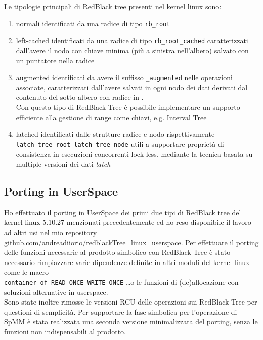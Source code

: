 \voidLine
Le tipologie principali di RedBlack tree presenti nel kernel linux sono:	\label{linuxRBTree_}
\begin{enumerate}
	\item normali  		identificati da una radice di tipo \verb|rb_root|
	\item left-cached 	identificati da una radice di tipo \verb|rb_root_cached|
		caratterizzati dall'avere il nodo con chiave minima (più a sinistra nell'albero) salvato con un puntatore nella radice
	\item augmented		identificati da avere il suffisso \verb|_augmented| nelle operazioni associate,
		caratterizzati dall'avere salvati in ogni nodo  dei dati derivati dal contenuto del sotto albero con radice in .\\
		Con questo tipo di RedBlack Tree è possibile implementare un supporto efficiente alla gestione di range come chiavi,
		e.g. Interval Tree \cite{rbtreeRst}
	\item latched		identificati dalle strutture radice e nodo rispettivamente \\ \verb|latch_tree_root latch_tree_node|
		utili a supportare proprietà di consistenza in esecuzioni concorrenti lock-less,
		mediante la tecnica basata su multiple versioni dei dati \emph{latch}
\end{enumerate}

\subsection{Porting in UserSpace} 
Ho effettuato il porting in UserSpace dei primi due tipi di RedBlack tree del kernel linux 5.10.27 menzionati precedentemente 
ed ho reso disponibile il lavoro ad altri usi nel mio repository \url{github.com/andreadiiorio/redblackTree_linux_userspace}.
\voidLine
Per effettuare il porting delle funzioni necessarie al prodotto simbolico con RedBlack Tree è stato necessario 
rimpiazzare varie dipendenze definite in altri moduli del kernel linux come 
le macro \\ \verb|container_of READ_ONCE WRITE_ONCE| \dots  o le funzioni di (de)allocazione
con soluzioni alternative in userspace.\\Sono state inoltre rimosse le versioni RCU delle operazioni sui RedBlack Tree per questioni di semplicità. 
\voidLine
Per supportare la fase simbolica per l'operazione di SpMM è stata realizzata una seconda versione minimalizzata del porting,
senza le funzioni non indispensabili al prodotto.\\

